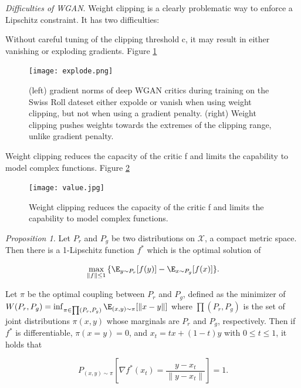 \documentclass[english]{article}
\begin{document}
\benum
\item {\emph{Difficulties of WGAN}}.
 Weight clipping is a clearly problematic way to enforce a Lipschitz constraint. It has two difficulties:
 ~\\
\item  Without careful tuning of the clipping threshold c, it may result in either vanishing or exploding gradients. Figure \ref{explode}







 \begin{figure}[h!]
  \centering
  \texttt{[image: explode.png]}
  \caption{(left) gradient norms of deep WGAN critics during training on the Swiss Roll dateset either expolde or vanish when using weight clipping, but not when using a gradient penalty. (right) Weight clipping pushes weights towards the extremes of the clipping range, unlike gradient penalty.}
  \label{explode}
  \end{figure}




\item Weight clipping reduces the capacity of the critic f and limits the capability to model complex functions. Figure \ref{value} 
\begin{figure}[h!]
  \centering
  \texttt{[image: value.jpg]}
    \caption{Weight clipping reduces the capacity of the critic f and limits the capability to model complex functions.}
  \label{value}
 \end{figure}




\item {\emph{Proposition 1.}}
Let $P_r$ and $P_g$ be two distributions on $\mathcal{X}$, a compact metric space. Then there is a 1-Lipschitz function $f^*$ which is the optimal solution of 

$$\max_{\|f\|\le 1} {\{\E_{y\sim P_r}[f(y)]-\E_{x\sim P_g}[f(x)]\}}.$$ 

Let $\pi$ be the optimal coupling between $P_r$ and $P_g$, defined as the minimizer of $W(P_r,P_g)=\inf_{\pi\in \prod(P_r,P_g)}\E_{(x,y)\sim\pi}[\|x-y\|]$ where $\prod(P_r,P_g)$ is the set of joint distributions $\pi(x,y)$ whose marginals are $P_r$ and $P_g$, respectively. Then if $f^*$ is differentiable, $\pi(x=y)=0$, and $x_t=tx+(1-t)y$ with $0\le t\le 1$, it holds that 

$$P_{(x,y)\sim\pi}[\nabla f^*(x_t)=\frac{y-x_t}{\|y-x_t\|}]=1.$$ 
\end{document}
